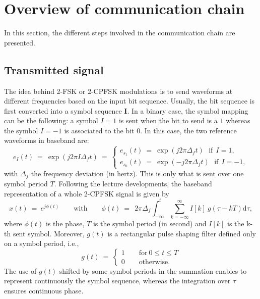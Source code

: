 \section{Overview of communication chain}
In this section, the different steps involved in the communication chain are presented.

\subsection{Transmitted signal}
The idea behind 2-FSK or 2-CPFSK modulations is to send waveforms at different frequencies based on the input bit sequence. Usually, the bit sequence is first converted into a symbol sequence $\mathbf{I}$. In a binary case, the symbol mapping can be the following: a symbol $I=1$ is sent when the bit to send is a $1$ whereas the symbol $I=-1$ is associated to the bit $0$. In this case, the two reference waveforms in baseband are:
\begin{equation*}
    e_I(t)\:=\:\exp{\left(j 2\pi I \Delta_f t \right)}\:=\:\begin{cases}
    e_{s_1}(t)\:=\:\exp{\left(j 2\pi \Delta_f t \right)}\:\:\:\text{if}\:\: I=1,\\
    e_{s_0}(t)\:=\:\exp{\left(-j 2\pi \Delta_f t \right)}\:\:\:\text{if}\:\: I=-1,
    \end{cases}
\end{equation*}
with $\Delta_f$ the frequency deviation (in hertz). This is only what is sent over one symbol period $T$. Following the lecture developments, the baseband representation of a whole 2-CPFSK signal is given by
\begin{equation*}
    x(t)\:=\:e^{j\phi(t)} \qquad \text{with} \qquad \phi(t)\:=\:\:2\pi \Delta_f \int_{-\infty}^t \sum_{k=-\infty}^{\infty}I[k]\:g(\tau-kT) \text{d}\tau,
\end{equation*}
where $\phi(t)$ is the phase, $T$ is the symbol period (in second) and $I[k]$ is the k-th sent symbol. Moreover, $g(t)$ is a rectangular pulse shaping filter defined only on a symbol period, i.e.,
\begin{equation*}
    g(t)\:=\:\begin{cases} 1 \qquad \text{for} \: 0 \leq t \leq T\\
    0 \qquad \text{otherwise.}
    \end{cases}
\end{equation*}
The use of $g(t)$ shifted by some symbol periods in the summation enables to represent continuously the symbol sequence, whereas the integration over $\tau$ ensures continuous phase.

